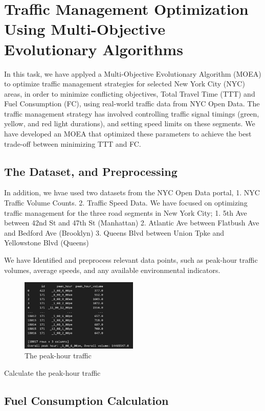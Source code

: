 \section{Traffic Management Optimization Using Multi-Objective Evolutionary Algorithms}

In this task, we have applyed a Multi-Objective Evolutionary Algorithm (MOEA) to optimize traffic management
strategies for selected New York City (NYC) areas, in order to  minimize conflicting
objectives, Total Travel Time (TTT) and Fuel Consumption (FC), using real-world traffic data
from NYC Open Data. The traffic management strategy has involved controlling traffic signal timings (green, yellow, and 
red light durations), and setting speed limits on these segments. We have developed an MOEA that optimized these parameters to achieve the best trade-off 
between minimizing TTT and FC.

\subsection{The Dataset, and Preprocessing}

In addition, we hvae used two datasets from the NYC Open Data portal,
1. NYC Traffic Volume Counts.
2. Traffic Speed Data.
We have focused on optimizing traffic management for the three road segments in New 
York City;  
1. 5th Ave between 42nd St and 47th St (Manhattan) 
2. Atlantic Ave between Flatbush Ave and Bedford Ave (Brooklyn) 
3. Queens Blvd between Union Tpke and Yellowstone Blvd (Queens) 

We have Identified and preprocess relevant data points, such as peak-hour traffic volumes, 
average speeds, and any available environmental indicators.

\begin{figure}[h]
    \centering
    \includegraphics[width=0.5\textwidth]{figures/peak_huours.PNG}
    \caption{The peak-hour traffic}
    \label{fig:sample}
\end{figure}


Calculate the peak-hour traffic

\subsection{Fuel Consumption Calculation}
